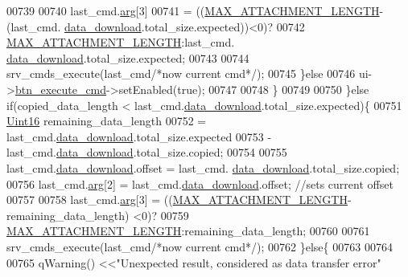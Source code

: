 \begin{DoxyCode}
{{00739                        
00740                        last\_cmd.\hyperlink{a00001_a56e6c2d7315d0ae60a51e8b140c9cfe4}{arg}[3]              
00741                                = ((\hyperlink{a00031_aa8abe3a822c64813f7aaba3ca7e3db9c}{MAX\_ATTACHMENT\_LENGTH}-(last\_cmd.
      \hyperlink{a00001_a5cfeaed4d4f8e51070a324c0ba893ebe}{data\_download}.total\_size.expected))<0)?
00742                                    \hyperlink{a00031_aa8abe3a822c64813f7aaba3ca7e3db9c}{MAX\_ATTACHMENT\_LENGTH}:last\_cmd.
      \hyperlink{a00001_a5cfeaed4d4f8e51070a324c0ba893ebe}{data\_download}.total\_size.expected;
00743 
00744                        srv\_cmds\_execute(last\_cmd\textcolor{comment}{/*now current cmd*/});
00745                    \}\textcolor{keywordflow}{else}
00746                        ui->\hyperlink{a00027_a9ea50d44e38316e4203933698cbc14a6}{btn\_execute\_cmd}->setEnabled(\textcolor{keyword}{true});
00747 
00748                    \}
00749 
00750                \}\textcolor{keywordflow}{else} \textcolor{keywordflow}{if}(copied\_data\_length < last\_cmd.\hyperlink{a00001_a5cfeaed4d4f8e51070a324c0ba893ebe}{data\_download}.total\_size.expected)\{
00751                    \hyperlink{a00001_aae7407b021d43f7193a81a58cfb3e297}{Uint16} remaining\_data\_length 
00752                            = last\_cmd.\hyperlink{a00001_a5cfeaed4d4f8e51070a324c0ba893ebe}{data\_download}.total\_size.expected 
00753                            - last\_cmd.\hyperlink{a00001_a5cfeaed4d4f8e51070a324c0ba893ebe}{data\_download}.total\_size.copied;
00754 
00755                    last\_cmd.\hyperlink{a00001_a5cfeaed4d4f8e51070a324c0ba893ebe}{data\_download}.offset = last\_cmd.
      \hyperlink{a00001_a5cfeaed4d4f8e51070a324c0ba893ebe}{data\_download}.total\_size.copied;
00756                    last\_cmd.\hyperlink{a00001_a56e6c2d7315d0ae60a51e8b140c9cfe4}{arg}[2] = last\_cmd.\hyperlink{a00001_a5cfeaed4d4f8e51070a324c0ba893ebe}{data\_download}.offset;  \textcolor{comment}{//sets current offset}
00757 
00758                    last\_cmd.\hyperlink{a00001_a56e6c2d7315d0ae60a51e8b140c9cfe4}{arg}[3] = ((\hyperlink{a00031_aa8abe3a822c64813f7aaba3ca7e3db9c}{MAX\_ATTACHMENT\_LENGTH}-remaining\_data\_length)
      <0)?
00759                                           \hyperlink{a00031_aa8abe3a822c64813f7aaba3ca7e3db9c}{MAX\_ATTACHMENT\_LENGTH}:remaining\_data\_length;
00760 
00761                    srv\_cmds\_execute(last\_cmd\textcolor{comment}{/*now current cmd*/});
00762                \}\textcolor{keywordflow}{else}\{
00763 
00764                    
00765                    qWarning() <<\textcolor{stringliteral}{"Unexpected result, considered as data transfer error"}
}}
\end{DoxyCode}
